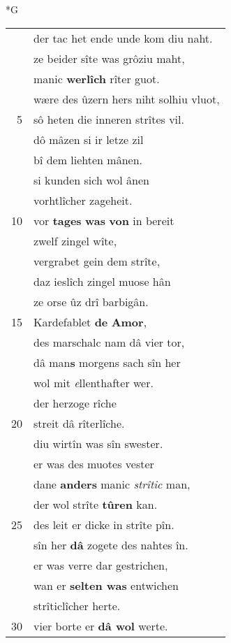\documentclass[8pt,a4paper,notitlepage]{article}
\begin{document}
\begin{table}[ht]
\begin{minipage}[t]{0.5\linewidth}
\small
\begin{center}*G
\end{center}
\begin{tabular}{rl}
 & der tac het ende unde kom diu naht.\\ 
 & ze beider sîte was grôziu maht,\\ 
 & manic \textbf{werlîch} rîter guot.\\ 
 & wære des ûzern hers niht solhiu vluot,\\ 
5 & sô heten die inneren strîtes vil.\\ 
 & dô mâzen si ir letze zil\\ 
 & bî dem liehten mânen.\\ 
 & si kunden sich wol ânen\\ 
 & vorhtlîcher zageheit.\\ 
10 & vor \textbf{tages} \textbf{was} \textbf{von} in bereit\\ 
 & zwelf zingel wîte,\\ 
 & vergrabet gein dem strîte,\\ 
 & daz ieslîch zingel muose hân\\ 
 & ze orse ûz drî barbigân.\\ 
15 & Kardefablet \textbf{de} \textbf{Amor},\\ 
 & des marschalc nam dâ vier tor,\\ 
 & dâ man\textbf{s} morgens sach sîn her\\ 
 & wol mit \textit{e}llenthafter wer.\\ 
 & der herzoge rîche\\ 
20 & streit dâ rîterlîche.\\ 
 & diu wirtîn was sîn swester.\\ 
 & er was des muotes vester\\ 
 & dane \textbf{anders} manic \textit{strîtic} man,\\ 
 & der wol strîte \textbf{tûren} kan.\\ 
25 & des leit er dicke in strîte pîn.\\ 
 & sîn her \textbf{dâ} zogete des nahtes în.\\ 
 & er was verre dar gestrichen,\\ 
 & wan er \textbf{selten was} entwichen\\ 
 & strîticlîcher herte.\\ 
30 & vier borte er \textbf{dâ wol} werte.\\ 

\end{tabular}
\end{minipage}
\end{table}
\end{document}
